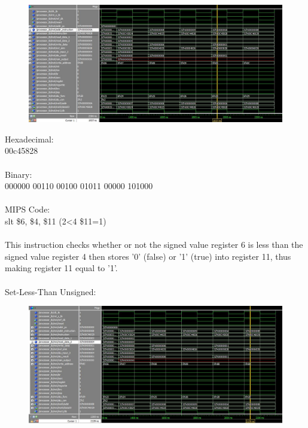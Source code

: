 \documentclass[paper=letter, fontsize=11pt]{scrartcl} %
\numberwithin{equation}{section}
\numberwithin{figure}{section}
\numberwithin{table}{section}
\begin{document}
\begin{figure}[H]
	\centering
		\includegraphics[width=150mm]{../sim/photo/setlessthansigned.JPG}
	\label{fig:Set-Less-Than Signed}
\end{figure}

Hexadecimal:
\\
00c45828
\\
\\
Binary:
\\
000000 00110 00100 01011 00000 101000
\\
\\
MIPS Code:
\\
slt \$6, \$4, \$11 (2<4 \$11=1)
\\
\\
This instruction checks whether or not the signed value register 6 is less than the signed value register 4 then stores '0' (false) or '1' (true) into register 11, thus making register 11 equal to '1'.
\\
\pagebreak
\\
Set-Less-Than Unsigned:

\begin{figure}[H]
	\centering
		\includegraphics[width=150mm]{../sim/photo/setlessthanunsigned.JPG}
	\label{fig:Set-Less-Than Unsigned}
\end{figure}
\end{document}
